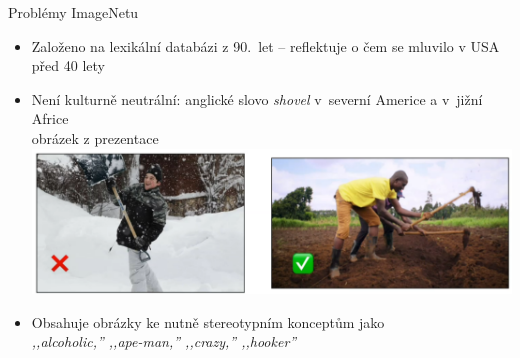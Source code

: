 \documentclass[aspectratio=169,dvipsnames]{beamer}
\begin{document}
\begin{frame}{Problémy ImageNetu}

    \begin{itemize}[<+->]

        \item Založeno na lexikální databázi z 90.\ let -- reflektuje o čem se
            mluvilo v USA před 40 lety

        \item Není kulturně neutrální: anglické slovo \emph{shovel} v~severní
            Americe a v~jižní Africe \\ {\tiny obrázek z prezentace
            \citet{liu-etal-2021-visually}} \\
            \includegraphics[scale=.35]{img/shovel.png}

        \item Obsahuje obrázky ke nutně stereotypním konceptům jako {\tiny \citep[str.\ 109]{crawford2021atlas}} \\
            \quad\it ,,alcoholic,'' ,,ape-­man,'' ,,crazy,'' ,,hooker''
    \end{itemize}

\end{frame}


\end{document}
